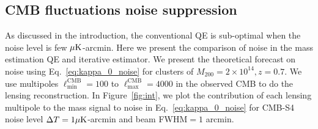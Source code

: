 \documentclass[prd, superscriptaddress, tightenlines, longbibliography, nofootinbib, eqsecnum, amsfonts, amsmath, floatfix, twocolumn, notitlepage]{revtex4-2}
\newcommand{\LL}[1]{{\color{orange}{LL: #1}}}
\begin{document}


\subsection{CMB fluctuations noise suppression}

As discussed in the introduction, the conventional QE is sub-optimal when the noise level is few $\mu \rm{K}$-arcmin. Here we present the comparison of noise in the mass estimation QE and iterative estimator. We present the theoretical forecast on noise using Eq.~\ref{eq:kappa_0_noise} for clusters of $M_{200} = 2\times 10^{14}, z=0.7$. We use multipoles $\ell_{\text{min}}^{\text{CMB}} = 100$ to $\ell_{\text{max}}^{\text{CMB}} = 4000$ in the observed CMB to do the lensing reconstruction. 
In Figure~\ref{fig:int}, we plot the contribution of each lensing multipole to the mass signal to noise in Eq.~\ref{eq:kappa_0_noise} for CMB-S4 noise level $\Delta T  = 1 \mu \rm{K}$-arcmin and beam FWHM$=1$ arcmin. 

\end{document}
